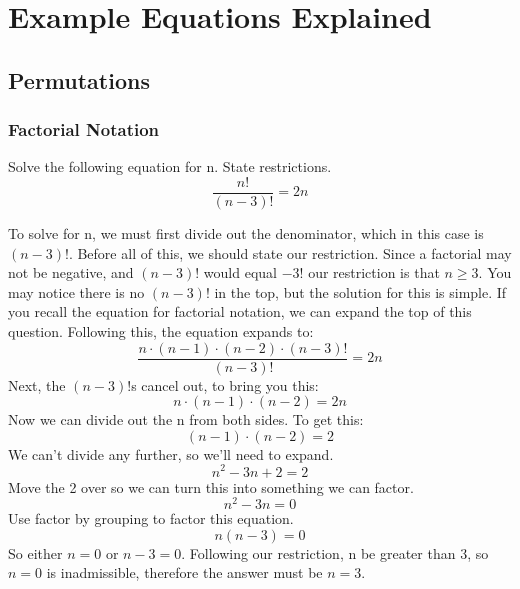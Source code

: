 \section{Example Equations Explained}

    \subsection{Permutations}
    
        \subsubsection{Factorial Notation}
            \begin{example}
                Solve the following equation for n. State restrictions.
                \begin{equation*}
                    \frac{n!}{(n-3)!}=2n
                \end{equation*}
            \end{example}
            To solve for n, we must first divide out the denominator, which in this case is $(n-3)!$. Before all of this, we should state our restriction. Since a factorial may not be negative, and $(n-3)!$ would equal $-3!$ our restriction is that \emph{$n\geqslant3$}. You may notice there is no $(n-3)!$ in the top, but the solution for this is simple. If you recall the equation for factorial notation, we can expand the top of this question.  Following this, the equation expands to:
            \begin{equation*}
                \frac{n\cdot(n-1)\cdot(n-2)\cdot(n-3)!}{(n-3)!}=2n
            \end{equation*}
            Next, the $(n-3)!$s cancel out, to bring you this:
            \begin{equation*}
                n\cdot(n-1)\cdot(n-2) = 2n
            \end{equation*}
            Now we can divide out the n from both sides. To get this:
            \begin{equation*}
                (n-1)\cdot(n-2) = 2
            \end{equation*}
            We can't divide any further, so we'll need to expand.
            \begin{equation*}
                n^2 -3n+2 = 2
            \end{equation*}
            Move the 2 over so we can turn this into something we can factor.
            \begin{equation*}
                n^2 -3n=0
            \end{equation*}
            Use factor by grouping to factor this equation.
            \begin{equation*}
                n(n-3)=0
            \end{equation*}
            So either $n=0$ or $n-3=0$. Following our restriction, n be greater than 3, so $n=0$ is inadmissible, therefore the answer must be $n=3$.
    \clearpage
